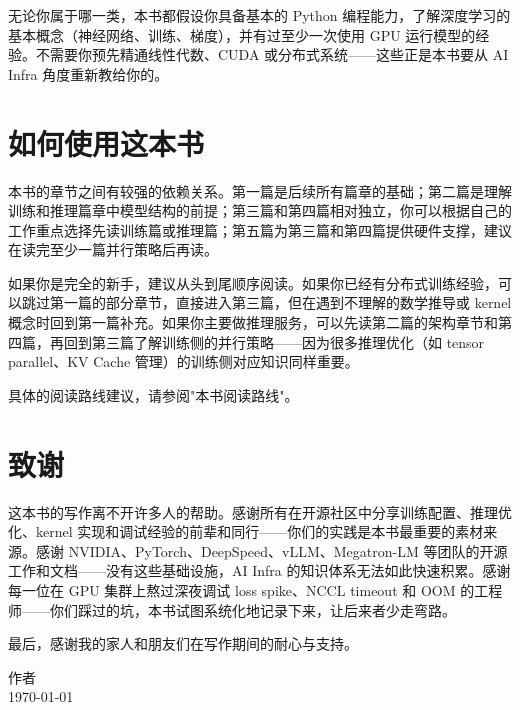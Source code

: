 无论你属于哪一类，本书都假设你具备基本的 Python 编程能力，了解深度学习的基本概念（神经网络、训练、梯度），并有过至少一次使用 GPU 运行模型的经验。不需要你预先精通线性代数、CUDA 或分布式系统——这些正是本书要从 AI Infra 角度重新教给你的。

\section*{如何使用这本书}

本书的章节之间有较强的依赖关系。第一篇是后续所有篇章的基础；第二篇是理解训练和推理篇章中模型结构的前提；第三篇和第四篇相对独立，你可以根据自己的工作重点选择先读训练篇或推理篇；第五篇为第三篇和第四篇提供硬件支撑，建议在读完至少一篇并行策略后再读。

如果你是完全的新手，建议从头到尾顺序阅读。如果你已经有分布式训练经验，可以跳过第一篇的部分章节，直接进入第三篇，但在遇到不理解的数学推导或 kernel 概念时回到第一篇补充。如果你主要做推理服务，可以先读第二篇的架构章节和第四篇，再回到第三篇了解训练侧的并行策略——因为很多推理优化（如 tensor parallel、KV Cache 管理）的训练侧对应知识同样重要。

具体的阅读路线建议，请参阅"本书阅读路线"。

\section*{致谢}

这本书的写作离不开许多人的帮助。感谢所有在开源社区中分享训练配置、推理优化、kernel 实现和调试经验的前辈和同行——你们的实践是本书最重要的素材来源。感谢 NVIDIA、PyTorch、DeepSpeed、vLLM、Megatron-LM 等团队的开源工作和文档——没有这些基础设施，AI Infra 的知识体系无法如此快速积累。感谢每一位在 GPU 集群上熬过深夜调试 loss spike、NCCL timeout 和 OOM 的工程师——你们踩过的坑，本书试图系统化地记录下来，让后来者少走弯路。

最后，感谢我的家人和朋友们在写作期间的耐心与支持。

\begin{flushright}
作者\\
\today
\end{flushright}